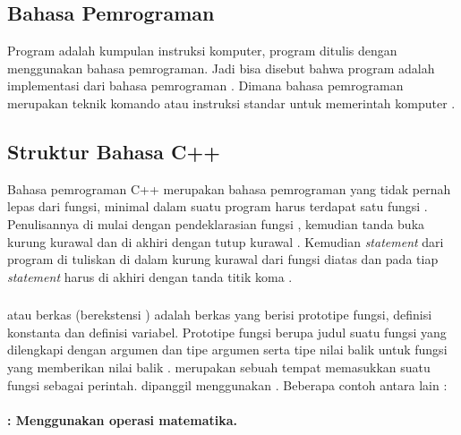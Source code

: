 \documentclass[../main.tex]{subfiles}
\begin{document}
    \subsection{Bahasa Pemrograman}
    Program adalah kumpulan instruksi komputer, program ditulis dengan menggunakan bahasa pemrograman. Jadi bisa disebut bahwa program adalah implementasi dari bahasa pemrograman \parencite{utami10}. Dimana bahasa pemrograman merupakan teknik komando atau instruksi standar untuk memerintah komputer \parencite{dewi2010media}.

    \subsection{Struktur Bahasa C++}
    Bahasa pemrograman C++ merupakan bahasa pemrograman yang tidak pernah lepas dari fungsi, minimal dalam suatu program harus terdapat satu fungsi . Penulisannya di mulai dengan pendeklarasian fungsi ,  kemudian tanda buka kurung kurawal  dan di akhiri dengan tutup kurawal . Kemudian \textit{statement} dari program di tuliskan di dalam kurung kurawal dari fungsi  diatas dan pada tiap \textit{statement} harus di akhiri dengan tanda titik koma  \parencite{friyadi2005panduan}.

    \subsubsection{{\Header} {\file}}
    \begin{indentlevel0}
        {\Header} {\file} atau berkas {\header} (berekstensi ) adalah berkas yang berisi prototipe fungsi, definisi konstanta dan definisi variabel. Prototipe fungsi berupa judul suatu fungsi yang dilengkapi dengan argumen dan tipe argumen serta tipe nilai balik untuk fungsi yang memberikan nilai balik \parencite{kadir2005heriyanto}. {\Header} {\file} merupakan sebuah tempat memasukkan suatu fungsi sebagai perintah. {\Header} {\file} dipanggil menggunakan {\directive} . Beberapa contoh {\header} {\file} antara lain \parencite{friyadi2005panduan}:
    \end{indentlevel0}
    \vspace*{-1ex}
    \paragraph{	: Menggunakan operasi matematika.}
\end{document}
